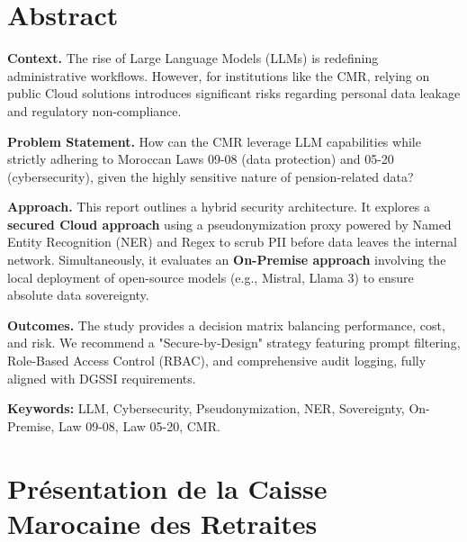 \documentclass[12pt, a4paper]{report}
\begin{document}
\newpage
\thispagestyle{plain}
\chapter*{Abstract}

\textbf{Context.} 
The rise of Large Language Models (LLMs) is redefining administrative workflows. However, for institutions like the CMR, relying on public Cloud solutions introduces significant risks regarding personal data leakage and regulatory non-compliance.

\medskip
\textbf{Problem Statement.} 
How can the CMR leverage LLM capabilities while strictly adhering to Moroccan Laws 09-08 (data protection) and 05-20 (cybersecurity), given the highly sensitive nature of pension-related data?

\medskip
\textbf{Approach.} 
This report outlines a hybrid security architecture. It explores a \textbf{secured Cloud approach} using a pseudonymization proxy powered by Named Entity Recognition (NER) and Regex to scrub PII before data leaves the internal network. Simultaneously, it evaluates an \textbf{On-Premise approach} involving the local deployment of open-source models (e.g., Mistral, Llama 3) to ensure absolute data sovereignty.

\medskip
\textbf{Outcomes.} 
The study provides a decision matrix balancing performance, cost, and risk. We recommend a "Secure-by-Design" strategy featuring prompt filtering, Role-Based Access Control (RBAC), and comprehensive audit logging, fully aligned with DGSSI requirements.

\medskip
\textbf{Keywords:} LLM, Cybersecurity, Pseudonymization, NER, Sovereignty, On-Premise, Law 09-08, Law 05-20, CMR.

\newpage
\thispagestyle{plain}
\tableofcontents
\newpage

\chapter{Présentation de la Caisse Marocaine des Retraites}
\end{document}
